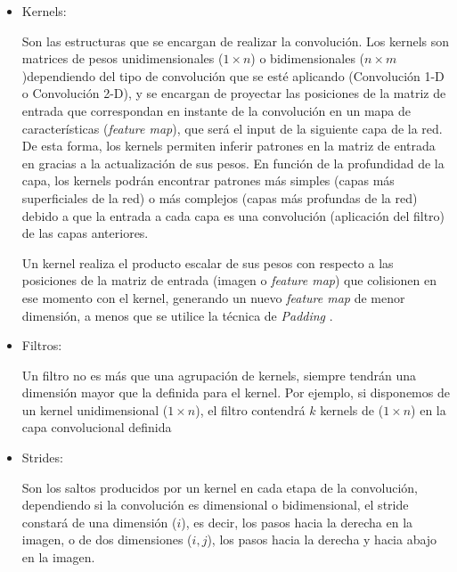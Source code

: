             \begin{itemize}

                \item Kernels:

                    Son las estructuras que se encargan de realizar la convolución. Los kernels son matrices de pesos unidimensionales ($1 \times n$) o bidimensionales ($n \times m$)dependiendo del tipo de convolución que se esté aplicando (Convolución 1-D o Convolución 2-D), y se encargan de proyectar las posiciones de la matriz de entrada que correspondan en instante de la convolución en un mapa de características (\textit{feature map}), que será el input de la siguiente capa de la red. De esta forma, los kernels permiten inferir patrones en la matriz de entrada en gracias a la actualización de sus pesos. En función de la profundidad de la capa, los kernels podrán encontrar patrones más simples (capas más superficiales de la red) o más complejos (capas más profundas de la red) debido a que la entrada a cada capa es una convolución (aplicación del filtro) de las capas anteriores.

                    Un kernel realiza el producto escalar de sus pesos con respecto a las posiciones de la matriz de entrada (imagen o \textit{feature map}) que colisionen en ese momento con el kernel, generando un nuevo \textit{feature map} de menor dimensión, a menos que se utilice la técnica de \textit{Padding} \cite{Kernels}.
                     
                \item Filtros:

                    Un filtro no es más que una agrupación de kernels, siempre tendrán una dimensión mayor que la definida para el kernel. Por ejemplo, si disponemos de un kernel unidimensional ($1 \times n$), el filtro contendrá $k$ kernels de ($1 \times n$) en la capa convolucional definida \cite{FiltersFeatureMaps}

                \item Strides:

                    Son los saltos producidos por un kernel en cada etapa de la convolución, dependiendo si la convolución es dimensional o bidimensional, el stride constará de una dimensión ($i$), es decir, los pasos hacia la derecha en la imagen, o de dos dimensiones ($i, j$), los pasos hacia la derecha y hacia abajo en la imagen.


\end{itemize}
